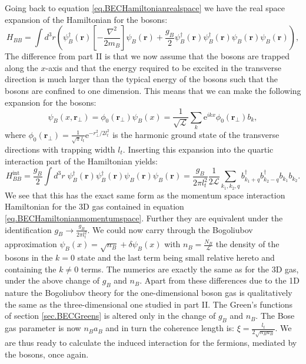 Going back to equation \eqref{eq.BECHamiltonianrealspace} we have the real space expansion of the Hamiltonian for the bosons:
\begin{equation}
H_{BB} = \int d^3 r \left(\psi_B^\dagger(\mathbf{r})\left[-\frac{\nabla^2}{2m_B}\right]\psi_B(\mathbf{r}) + \frac{g_B}{2}\psi_B^\dagger(\mathbf{r})\psi_B^\dagger(\mathbf{r})\psi_B(\mathbf{r})\psi_B(\mathbf{r})  \right), \nonumber
\end{equation}
The difference from part II is that we now assume that the bosons are trapped along the $x$-axis and that the energy required to be excited in the transverse direction is much larger than the typical energy of the bosons such that the bosons are confined to one dimension. This means that we can make the following expansion for the bosons:
\begin{equation}
\psi_B(x, \mathbf{r}_{\perp}) = \phi_0(\mathbf{r}_{\perp}) \psi_B(x) = \frac{1}{\sqrt{\mathcal{L}}} \sum_k \text{e}^{ikx} \phi_0(\mathbf{r}_{\perp}) b_k, 
\nonumber
\end{equation}
where $\phi_0(\mathbf{r}_\perp) = \frac{1}{\sqrt{\pi}l_t}\text{e}^{-r_{\perp}^2/2l_t^2}$ is the harmonic ground state of the transverse directions with trapping width $l_t$. Inserting this expansion into the quartic interaction part of the Hamiltonian yields:
\begin{equation}
H_{BB}^{\text{int}} = \frac{g_B}{2}\int d^3 r \; \psi_B^\dagger(\mathbf{r})\psi_B^\dagger(\mathbf{r})\psi_B(\mathbf{r})\psi_B(\mathbf{r}) = \frac{g_B}{2\pi l_t^2}\frac{1}{2\mathcal{L}}\sum_{k_1,k_2,q} b^\dagger_{k_1 + q}b^\dagger_{k_2 - q}b_{k_1}b_{k_2}. \nonumber
\end{equation}
We see that this has the exact same form as the momentum space interaction Hamiltonian for the 3D gas contained in equation \eqref{eq.BECHamiltonianmomentumspace}. Further they are equivalent under the identification $g_B \to \frac{g_B}{2\pi l_t^2}$. We could now carry through the Bogoliubov approximation $\psi_B(x) = \sqrt{n_B} + \delta\psi_B(x)$ with $n_B = \frac{N_B}{\mathcal{L}}$ the density of the bosons in the $k = 0$ state and the last term being small relative hereto and containing the $k \neq 0$ terms. The numerics are exactly the same as for the 3D gas, under the above change of $g_B$ and $n_B$. Apart from these differences due to the 1D nature the Bogoliubov theory for the one-dimensional boson gas is qualitatively the same as the three-dimensional one studied in part II. The Green's functions of section \ref{sec.BECGreens} is altered only in the change of $g_B$ and $n_B$. The Bose gas parameter is now $n_Ba_B$ and in turn the coherence length is: $\xi = \frac{l_t}{2\sqrt{n_Ba_B}}$. We are thus ready to calculate the induced interaction for the fermions, mediated by the bosons, once again.

